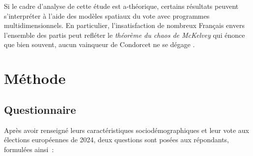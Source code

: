 \documentclass[12pt,french]{article}
\begin{document}
Si le cadre d'analyse de cette étude est a-théorique, certains résultats peuvent s'interpréter à l'aide des modèles spatiaux du vote avec programmes multidimensionnels. En particulier, l'insatisfaction de nombreux Français envers l'ensemble des partis peut refléter le \textit{théorème du chaos de McKelvey} qui énonce que bien souvent, aucun vainqueur de Condorcet ne se dégage \citep{downs_economic_1957,davis_expository_1970,enelow_spatial_1984,mckelvey_intransitivities_1976}. 



\section{Méthode}
\label{sec:methode}

\subsection{Questionnaire}

Après avoir renseigné leurs caractéristiques sociodémographiques et leur vote aux élections européennes de 2024, deux questions sont posées aux répondants, formulées ainsi~:
\end{document}
